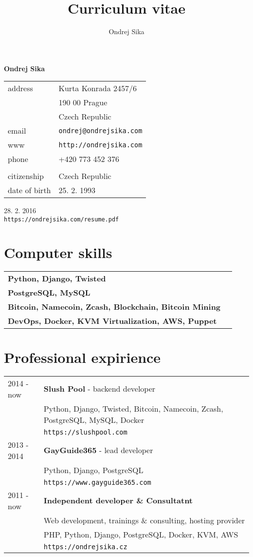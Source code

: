 \documentclass[12pt,a4paper]{article}
\title{Curriculum vitae}
\author{Ondrej Sika}
\begin{document}
\begin{center}
{\LARGE \bf Ondrej Sika}\\
\vspace*{0.2cm}
\begin{tabular}{R{5cm}L{5cm}}
address & Kurta Konrada 2457/6\\
 & 190 00 Prague\\
 & Czech Republic\\
email & \texttt{ondrej@ondrejsika.com}\\
www & \texttt{http://ondrejsika.com}\\
phone & +420 773 452 376\\
\\
citizenship & Czech Republic\\
date of birth & 25. 2. 1993\\
\end{tabular}

\vspace*{0.3cm}
{\hfill 28. 2. 2016}\\
{\hfill \texttt{https://ondrejsika.com/resume.pdf}}
\end{center}

\section*{Computer skills}
\begin{tabular}{@{}ll}
{\bf Python, Django, Twisted} & \\
{\bf PostgreSQL, MySQL} & \\
{\bf Bitcoin, Namecoin, Zcash, Blockchain, Bitcoin Mining} & \\
{\bf DevOps, Docker, KVM Virtualization, AWS, Puppet} & \\
\end{tabular}

\section*{Professional expirience}
\begin{tabular}{@{}p{2cm}l}
2014 - now & {\bf Slush Pool} - backend developer\\
 & Python, Django, Twisted, Bitcoin, Namecoin, Zcash, PostgreSQL, MySQL, Docker\\
 & \texttt{https://slushpool.com}\\
2013 - 2014 & {\bf GayGuide365} - lead developer\\
 & Python, Django, PostgreSQL\\
 & \texttt{https://www.gayguide365.com}\\
2011 - now & {\bf Independent developer \& Consultatnt}\\
    & Web development, trainings \& consulting, hosting provider\\
    & PHP, Python, Django, PostgreSQL, Docker, KVM, AWS\\
 & \texttt{https://ondrejsika.cz}\\
\end{tabular}
\end{document}
